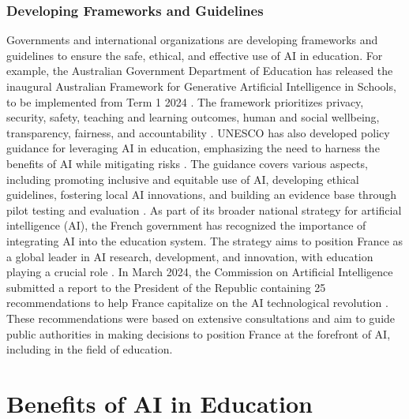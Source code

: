 \documentclass{article}
\begin{document}



\subsubsection{Developing Frameworks and Guidelines} %
Governments and international organizations are developing
frameworks and guidelines to ensure the safe, ethical,
and effective use of AI in education. For example,
the Australian Government Department of Education has released
the inaugural Australian Framework for Generative Artificial
Intelligence in Schools, to be implemented from
Term 1 2024 \cite{educationmatters_ai_framework}.
The framework prioritizes privacy, security, safety,
teaching and learning outcomes, human and social wellbeing,
transparency, fairness, and accountability
\cite{educationmatters_ai_framework}.
UNESCO has also developed policy guidance for leveraging
AI in education, emphasizing the need to harness the benefits
of AI while mitigating risks
\cite{teachingtomorrow_ai_education}. The guidance covers
various aspects, including promoting inclusive and
equitable use of AI, developing ethical guidelines,
fostering local AI innovations, and building an evidence
base through pilot testing and evaluation
\cite{teachingtomorrow_ai_education}.
As part of its broader national strategy for artificial intelligence
(AI), the French government has recognized the importance
of integrating AI into the education system. The strategy
aims to position France as a global leader in AI research,
development, and innovation, with education playing
a crucial role \cite{economie_gouv_ai_strategy}
\cite{entreprises_gouv_ai_strategy}. In March 2024, the
Commission on Artificial Intelligence submitted a report
to the President of the Republic containing 25 recommendations
to help France capitalize on the AI technological
revolution \cite{edunumrech_ai_recommendations}
\cite{ac_paris_ai_education}
\cite{campusmatin_ai_recommendations}.
These recommendations were based on extensive consultations and aim to guide public authorities in making decisions to position France at the forefront of AI, including in the field of education.



\newpage


\section{Benefits of AI in Education}
\end{document}
